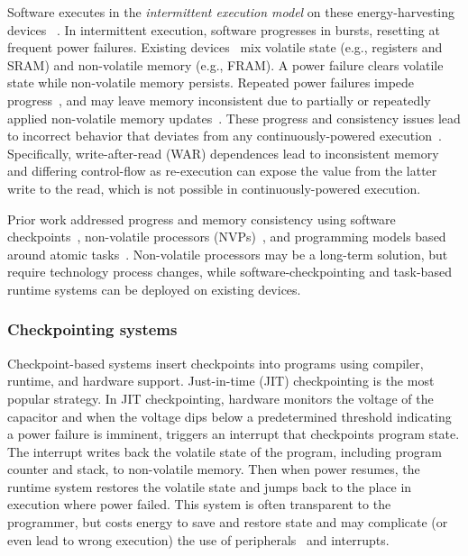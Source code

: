 Software executes in the {\em intermittent execution model} on these
energy-harvesting devices ~\cite{mementos,dino,dewdrop,quickrecall,idetic,jerger2017ehmodel}.
% 
In intermittent execution, software progresses in bursts, resetting
at frequent power failures.
% 
Existing devices~\cite{wolverine,msp430fr5994} mix volatile state (e.g., registers and SRAM) and non-volatile memory (e.g., FRAM). 
% 
A power failure clears volatile state while non-volatile memory persists.
%
Repeated power failures impede progress~\cite{mementos}, and may leave memory
inconsistent due to partially or repeatedly applied non-volatile memory
updates~\cite{dino}.
% 
These progress and consistency issues lead to incorrect
behavior that deviates from any continuously-powered execution~\cite{edb}.
% 
Specifically, write-after-read (WAR) dependences lead to inconsistent memory and differing control-flow as re-execution can expose the value from the latter write to the read, which is not possible in continuously-powered execution.

Prior work addressed progress and memory consistency using software
checkpoints~\cite{dino,ratchet,clank}, non-volatile processors (NVPs)~\cite{nvp,ma2017incidental},
and programming models based around atomic tasks~\cite{chain,alpaca,mayfly,alpaca}.
% 
Non-volatile processors may be a long-term solution, but require technology process changes, while software-checkpointing and task-based runtime systems can be deployed on existing devices.

\subsubsection{Checkpointing systems}
Checkpoint-based systems insert checkpoints into programs using compiler, runtime, and hardware support.
% 
Just-in-time (JIT) checkpointing is the most popular strategy.
% 
In JIT checkpointing, hardware monitors the voltage of the capacitor and when the voltage dips below a predetermined threshold indicating a power failure is imminent, triggers an interrupt that checkpoints program state. 
% 
The interrupt writes back the volatile state of the program, including program counter and stack, to non-volatile memory.
% 
Then when power resumes, the runtime system restores the volatile state and jumps back to the place in execution where power failed.
% 
This system is often transparent to the programmer, but costs energy to save and restore state and may complicate (or even lead to wrong execution) the use of peripherals~\cite{surbatovich2021automatically} and interrupts.

